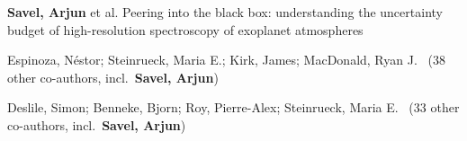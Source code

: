 


\item[{\color{numcolor}\scriptsize6}] \textbf{Savel, Arjun} et al. Peering into the black box: understanding the uncertainty budget of high-resolution spectroscopy of exoplanet atmospheres
\item[{\color{numcolor}\scriptsize5}] Espinoza, Néstor; Steinrueck, Maria E.; Kirk, James; MacDonald, Ryan J. \etal\ ({38} other co-authors, incl.\ \textbf{Savel, Arjun})
\item[{\color{numcolor}\scriptsize4}] Deslile, Simon; Benneke, Bjorn; Roy, Pierre-Alex; Steinrueck, Maria E. \etal\ ({33} other co-authors, incl.\ \textbf{Savel, Arjun})
